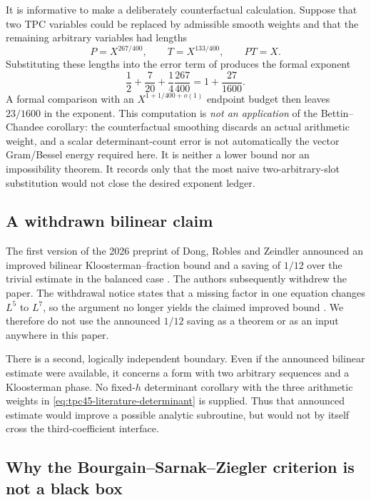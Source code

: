 \begin{remark}
\label{rem:tpc45-bc-ledger-not-theorem}
It is informative to make a deliberately counterfactual calculation.
Suppose that two TPC variables could be replaced by admissible smooth
weights and that the remaining arbitrary variables had lengths
\[
 P=X^{267/400},\qquad T=X^{133/400},\qquad PT=X.
\]
Substituting these lengths into the error term of
\cite[Corollary~1]{BC2018} produces the formal exponent
\[
 \frac12+\frac7{20}
 +\frac14\frac{267}{400}
 =1+\frac{27}{1600}.
\]
A formal comparison with an \(X^{1+1/400+o(1)}\) endpoint budget then
leaves \(23/1600\) in the exponent.  This computation is
\emph{not an application} of the Bettin--Chandee corollary: the
counterfactual smoothing discards an actual arithmetic weight, and a
scalar determinant-count error is not automatically the vector
Gram/Bessel energy required here.  It is neither a lower bound nor an
impossibility theorem.  It records only that the most naive
two-arbitrary-slot substitution would not close the desired exponent
ledger.
\end{remark}

\subsection{A withdrawn bilinear claim}

The first version of the 2026 preprint of Dong, Robles and Zeindler
announced an improved bilinear Kloosterman--fraction bound and a saving
of \(1/12\) over the trivial estimate in the balanced case
\cite[Theorems~1.4--1.6]{DRZ2026}.  The authors subsequently withdrew
the paper.  The withdrawal notice states that a missing factor in one
equation changes \(L^5\) to \(L^7\), so the argument no longer yields
the claimed improved bound \cite{DRZ2026}.  We therefore do not use the
announced \(1/12\) saving as a theorem or as an input anywhere in this
paper.

There is a second, logically independent boundary.  Even if the
announced bilinear estimate were available, it concerns a form with two
arbitrary sequences and a Kloosterman phase.  No fixed-\(h\)
determinant corollary with the three arithmetic weights in
\eqref{eq:tpc45-literature-determinant} is supplied.  Thus that announced
estimate would improve a possible analytic subroutine, but would not by
itself cross the third-coefficient interface.

\subsection{Why the Bourgain--Sarnak--Ziegler criterion is not a black box}

